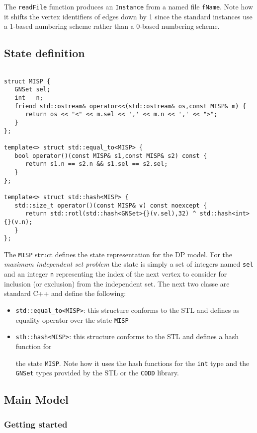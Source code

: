\documentclass[11pt]{article}
\begin{document}
The \texttt{readFile}  function produces an \texttt{Instance} from a named file \texttt{fName}. Note how it shifts the vertex identifiers of edges down by 1 since the standard instances use a 1-based numbering scheme rather than a 0-based numbering scheme.

\subsection{State definition}
\label{sec:org13f5de6}
\begin{verbatim}

struct MISP {
   GNSet sel;
   int   n;
   friend std::ostream& operator<<(std::ostream& os,const MISP& m) {
      return os << "<" << m.sel << ',' << m.n << ',' << ">";
   }
};

template<> struct std::equal_to<MISP> {
   bool operator()(const MISP& s1,const MISP& s2) const {
      return s1.n == s2.n && s1.sel == s2.sel;         
   }
};

template<> struct std::hash<MISP> {
   std::size_t operator()(const MISP& v) const noexcept {
      return std::rotl(std::hash<GNSet>{}(v.sel),32) ^ std::hash<int>{}(v.n);
   }
};
\end{verbatim}
The \texttt{MISP} struct defines the state representation for the DP model. For the \emph{maximum independent set problem} the state is simply a set of integers named \texttt{sel} and an
integer \texttt{n} representing the index of the next vertex to consider for inclusion (or exclusion) from the independent set. The next two classe are standard C++ and define the following:
\begin{itemize}
\item \texttt{std::equal\_to<MISP>}: this structure conforms to the STL and defines as equality operator over the state \texttt{MISP}
\item \texttt{sth::hash<MISP>}: this structure conforms to the STL and defines a hash function for

  the state \texttt{MISP}. Note how it uses the hash functions for the \texttt{int} type and the
\texttt{GNSet} types provided by the STL or the \texttt{CODD} library.
\end{itemize}

\subsection{Main Model}
\label{sec:org04ad812}

\subsubsection{Getting started}
\label{sec:org8d8d964}
\end{document}

